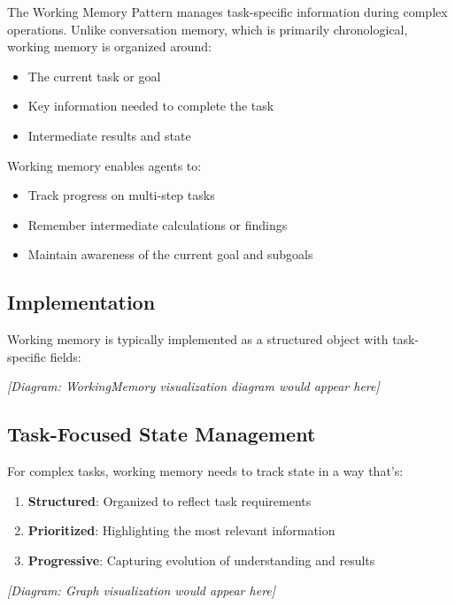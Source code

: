 \documentclass[11pt,oneside]{book}
\providecommand{\tightlist}{%
  \setlength{\itemsep}{0pt}\setlength{\parskip}{0pt}}
\begin{document}
The Working Memory Pattern manages task-specific information during
complex operations. Unlike conversation memory, which is primarily
chronological, working memory is organized around:

\begin{itemize}
\tightlist
\item
  The current task or goal
\item
  Key information needed to complete the task
\item
  Intermediate results and state
\end{itemize}

Working memory enables agents to:

\begin{itemize}
\tightlist
\item
  Track progress on multi-step tasks
\item
  Remember intermediate calculations or findings
\item
  Maintain awareness of the current goal and subgoals
\end{itemize}

\subsection{Implementation}\label{implementation}

Working memory is typically implemented as a structured object with
task-specific fields:

\emph{{[}Diagram: WorkingMemory visualization diagram would appear
here{]}}

\subsection{Task-Focused State
Management}\label{task-focused-state-management}

For complex tasks, working memory needs to track state in a way that's:

\begin{enumerate}
\def\labelenumi{\arabic{enumi}.}
\tightlist
\item
  \textbf{Structured}: Organized to reflect task requirements
\item
  \textbf{Prioritized}: Highlighting the most relevant information
\item
  \textbf{Progressive}: Capturing evolution of understanding and results
\end{enumerate}

\emph{{[}Diagram: Graph visualization would appear here{]}}
\end{document}
